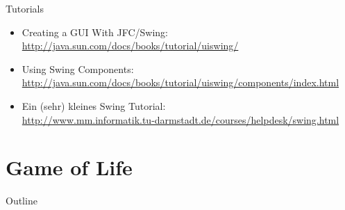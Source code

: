 \begin{frame}{Tutorials}
  \begin{itemize}
  \item Creating a GUI With JFC/Swing:\\
    \url{http://java.sun.com/docs/books/tutorial/uiswing/}
  \item Using Swing Components:\\
    \url{http://java.sun.com/docs/books/tutorial/uiswing/components/index.html}
  \item Ein (sehr) kleines Swing Tutorial:\\
    \url{http://www.mm.informatik.tu-darmstadt.de/courses/helpdesk/swing.html}
  \end{itemize}
\end{frame}


\section{Game of Life}

\begin{frame}{Outline}
  \tableofcontents[current]
\end{frame}

